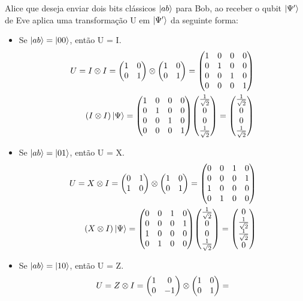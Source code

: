 \documentclass[a4paper, 12pt, oneside]{book}
\begin{document}
Alice que deseja enviar dois bits clássicos $\ket{ab}$ para Bob, ao receber o qubit $\ket{\Psi'}$ de Eve aplica uma transformação U em $\ket{\Psi'}$ da seguinte forma:
\begin{itemize}
\item Se $\ket{ab}=\ket{00}$, então U = I.
\begin{align}
U = I\otimes I = \mqty(1&0\\0&1)\otimes\mqty(1&0\\0&1) = 
	\mqty(1&0&0&0\\0&1&0&0\\0&0&1&0\\0&0&0&1) \\
(I\otimes I)\ket{\Psi} = \mqty(1&0&0&0\\0&1&0&0\\0&0&1&0\\0&0&0&1)
	\mqty(\frac{1}{\sqrt{2}}\\0\\ 0\\ \frac{1}{\sqrt{2}}) 
	= \mqty(\frac{1}{\sqrt{2}}\\0\\ 0\\ \frac{1}{\sqrt{2}}) 
\end{align}
\item Se $\ket{ab}=\ket{01}$, então U = X.
\begin{align}
U = X\otimes I = \mqty(0&1\\1&0)\otimes\mqty(1&0\\0&1) = 
	\mqty(0&0&1&0\\0&0&0&1\\1&0&0&0\\0&1&0&0) \\
(X\otimes I)\ket{\Psi} =  \mqty(0&0&1&0\\0&0&0&1\\1&0&0&0\\0&1&0&0) 
	\mqty(\frac{1}{\sqrt{2}}\\0\\ 0\\ \frac{1}{\sqrt{2}}) 
	= \mqty(0\\ \frac{1}{\sqrt{2}}\\ \frac{1}{\sqrt{2}}\\ 0)\label{eq34}
\end{align}
\item Se $\ket{ab}=\ket{10}$, então U = Z.
\begin{align}
U = Z\otimes I = \mqty(1&0\\0&-1)\otimes\mqty(1&0\\0&1) = 

\end{align}
\end{itemize}
\end{document}
